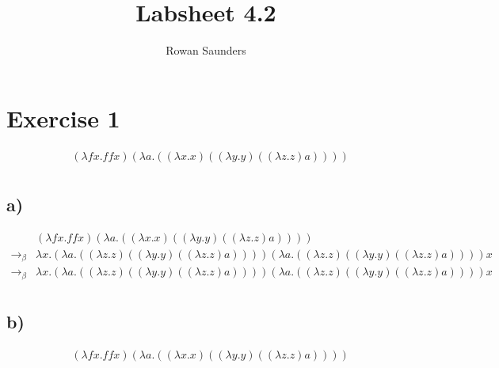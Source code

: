 \documentclass[11pt]{article}
\title{Labsheet 4.2}
\author{Rowan Saunders}
\begin{document}
\maketitle

\section{Exercise 1}

\begin{align*}
  & (\lambda fx.ffx)(\lambda a.((\lambda x.x)((\lambda y.y)((\lambda z.z)a))))\\
\end{align*}

\subsection{a)}

\begin{align*}
  & (\lambda fx.ffx)(\lambda a.((\lambda x.x)((\lambda y.y)((\lambda z.z)a))))\\
  \to_\beta& \lambda x.(\lambda a.((\lambda z.z)((\lambda y.y)((\lambda z.z)a))))(\lambda a.((\lambda z.z)((\lambda y.y)((\lambda z.z)a))))x\\
  \to_\beta& \lambda x.(\lambda a.((\lambda z.z)((\lambda y.y)((\lambda z.z)a))))(\lambda a.((\lambda z.z)((\lambda y.y)((\lambda z.z)a))))x\\
\end{align*}


\subsection{b)}

\begin{align*}
  & (\lambda fx.ffx)(\lambda a.((\lambda x.x)((\lambda y.y)((\lambda z.z)a))))\\
\end{align*}
\end{document}
